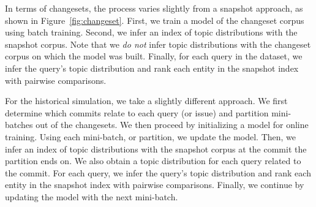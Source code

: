 In terms of changesets, the process varies slightly from a snapshot approach, as
shown in Figure~\ref{fig:changeset}.  First, we train a model of the changeset
corpus using batch training.  Second, we infer an index of topic distributions
with the snapshot corpus.  Note that we \emph{do not} infer topic distributions
with the changeset corpus on which the model was built.  Finally, for each query
in the dataset, we infer the query's topic distribution and rank each entity in
the snapshot index with pairwise comparisons.

For the historical simulation, we take a slightly different approach.  We first
determine which commits relate to each query (or issue) and partition
mini-batches out of the changesets.  We then proceed by initializing a model for
online training.  Using each mini-batch, or partition, we update the model.
Then, we infer an index of topic distributions with the snapshot corpus at the
commit the partition ends on.  We also obtain a topic distribution for each
query related to the commit.  For each query, we infer the query's topic
distribution and rank each entity in the snapshot index with pairwise
comparisons. Finally, we continue by updating the model with the next
mini-batch.

